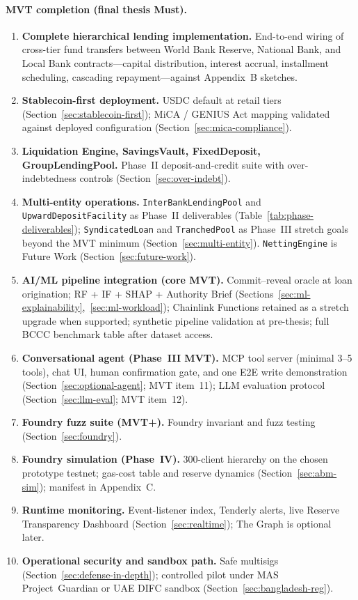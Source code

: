 \documentclass[12pt,a4paper]{report}
\begin{document}
\paragraph{MVT completion (final thesis Must).}
\begin{enumerate}[noitemsep]
\item \textbf{Complete hierarchical lending implementation.} End-to-end wiring of cross-tier fund transfers between World Bank Reserve, National Bank, and Local Bank contracts---capital distribution, interest accrual, installment scheduling, cascading repayment---against Appendix~B sketches.
\item \textbf{Stablecoin-first deployment.} USDC default at retail tiers (Section~\ref{sec:stablecoin-first}); MiCA / GENIUS Act mapping validated against deployed configuration (Section~\ref{sec:mica-compliance}).
\item \textbf{Liquidation Engine, SavingsVault, FixedDeposit, GroupLendingPool.} Phase~II deposit-and-credit suite with over-indebtedness controls (Section~\ref{sec:over-indebt}).
\item \textbf{Multi-entity operations.} \texttt{InterBankLendingPool} and \texttt{UpwardDepositFacility} as Phase~II deliverables (Table~\ref{tab:phase-deliverables}); \texttt{SyndicatedLoan} and \texttt{TranchedPool} as Phase~III stretch goals beyond the MVT minimum (Section~\ref{sec:multi-entity}). \texttt{NettingEngine} is Future Work (Section~\ref{sec:future-work}).
\item \textbf{AI/ML pipeline integration (core MVT).} Commit--reveal oracle at loan origination; RF + IF + SHAP + Authority Brief (Sections~\ref{sec:ml-explainability},~\ref{sec:ml-workload}); Chainlink Functions retained as a stretch upgrade when supported; synthetic pipeline validation at pre-thesis; full BCCC benchmark table after dataset access.
\item \textbf{Conversational agent (Phase~III MVT).} MCP tool server (minimal 3--5 tools), chat UI, human confirmation gate, and one E2E write demonstration (Section~\ref{sec:optional-agent}; MVT item~11); LLM evaluation protocol (Section~\ref{sec:llm-eval}; MVT item~12).
\item \textbf{Foundry fuzz suite (MVT+).} Foundry invariant and fuzz testing (Section~\ref{sec:foundry}).
\item \textbf{Foundry simulation (Phase~IV).} 300-client hierarchy on the chosen prototype testnet; gas-cost table and reserve dynamics (Section~\ref{sec:abm-sim}); manifest in Appendix~C.
\item \textbf{Runtime monitoring.} Event-listener index, Tenderly alerts, live Reserve Transparency Dashboard (Section~\ref{sec:realtime}); The Graph is optional later.
\item \textbf{Operational security and sandbox path.} Safe multisigs (Section~\ref{sec:defense-in-depth}); controlled pilot under MAS Project~Guardian or UAE DIFC sandbox (Section~\ref{sec:bangladesh-reg}).
\end{enumerate}
\end{document}
